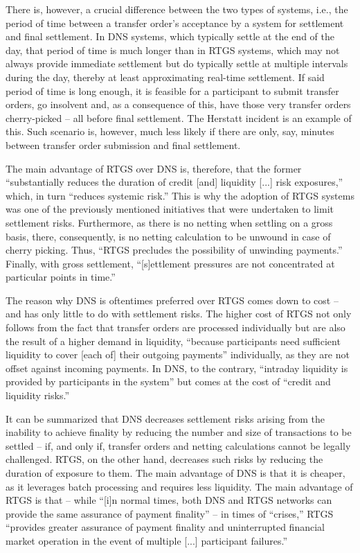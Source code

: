 There is, however, a crucial difference between the two types of systems, i.e., the period of time between a transfer order's acceptance by a system for settlement and final settlement.
In DNS systems, which typically settle at the end of the day, that period of time is much longer than in RTGS systems, which may not always provide immediate settlement but do typically settle at multiple intervals during the day, thereby at least approximating real-time settlement.
If said period of time is long enough, it is feasible for a participant to submit transfer orders, go insolvent and, as a consequence of this, have those very transfer orders cherry-picked -- all before final settlement.
The Herstatt incident is an example of this.
Such scenario is, however, much less likely if there are only, say, minutes between transfer order submission and final settlement.

The main advantage of RTGS over DNS is, therefore, that the former ``substantially reduces the duration of credit [and] liquidity [...] risk exposures,'' which, in turn ``reduces systemic risk.'' \autocite[43]{vereecken2003}
This is why the adoption of RTGS systems was one of the previously mentioned initiatives  that were undertaken to limit settlement risks.
Furthermore, as there is no netting when settling on a gross basis, there, consequently, is no netting calculation to be unwound in case of cherry picking.
Thus, ``RTGS precludes the possibility of unwinding payments.'' \autocite[43]{vereecken2003}
Finally, with gross settlement, ``[s]ettlement pressures are not concentrated at particular points in time.'' \autocite[43]{vereecken2003}

The reason why DNS is oftentimes preferred over RTGS comes down to cost -- and has only little to do with settlement risks.
The higher cost of RTGS not only follows from the fact that transfer orders are processed individually but are also the result of a higher demand in liquidity, ``because participants need sufficient liquidity to cover [each of] their outgoing payments'' \autocite[26]{cpmi2001} individually, as they are not offset against incoming payments.
In DNS, to the contrary, ``intraday liquidity is provided by participants in the system'' but comes at the cost of ``credit and liquidity risks.'' \autocite[26]{cpmi2001}

It can be summarized that DNS decreases settlement risks arising from the inability to achieve finality by reducing the number and size of transactions to be settled -- if, and only if, transfer orders and netting calculations cannot be legally challenged.
RTGS, on the other hand, decreases such risks by reducing the duration of exposure to them.
The main advantage of DNS is that it is cheaper, as it leverages batch processing and requires less liquidity.
The main advantage of RTGS is that -- while ``[i]n normal times, both DNS and RTGS networks can provide the same assurance of payment finality'' -- in times of ``crises,'' RTGS ``provides greater assurance of payment finality and uninterrupted financial market operation in the event of multiple [...] participant failures.'' \autocite[5]{pages2005}

